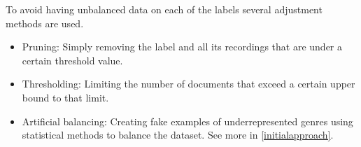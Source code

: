 To avoid having unbalanced data on each of the labels several adjustment methods are used.

\begin{itemize}
    \item Pruning: Simply removing the label and all its recordings that are under a certain threshold value.
    \item Thresholding: Limiting the number of documents that exceed a certain upper bound to that limit.
    \item Artificial balancing: Creating fake examples of underrepresented genres using statistical methods to balance the dataset. See more in \ref{initialapproach}. 
\end{itemize}



